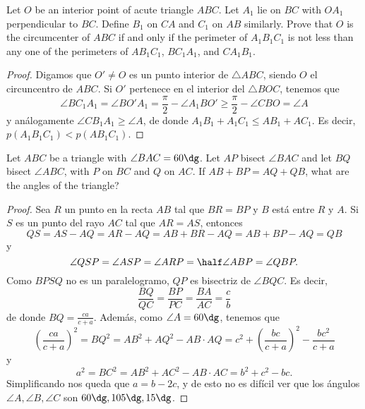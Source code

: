 \begin{probEG}[ISL 2001/G7]
  Let $O$ be an interior point of acute triangle $ABC$. Let $A_1$ lie on $BC$
  with $OA_1$ perpendicular to $BC$. Define $B_1$ on $CA$ and $C_1$ on $AB$
  similarly. Prove that $O$ is the circumcenter of $ABC$ if and only if the
  perimeter of $A_1B_1C_1$ is not less than any one of the perimeters of
  $AB_1C_1$, $BC_1A_1$, and $CA_1B_1$.
\end{probEG}

\begin{proof}
  Digamos que $O'\ne O$ es un punto interior de $\triangle ABC$, siendo $O$ el
  circuncentro de $ABC$. Si $O'$ pertenece en el interior del $\triangle BOC$,
  tenemos que
  \[
    \angle BC_1A_1
    =\angle BO'A_1
    =\frac{\pi}{2}-\angle A_1BO'
    \ge\frac{\pi}{2}-\angle CBO
    =\angle A
  \]
  y análogamente $\angle CB_1A_1\ge\angle A$, de donde
  $A_1B_1+A_1C_1\le AB_1+AC_1$. Es decir, $p(A_1B_1C_1)<p(AB_1C_1)$.
\end{proof}

\begin{probEG}[ISL 2001/G8]
  Let $ABC$ be a triangle with $\angle BAC=60\dg$. Let $AP$ bisect $\angle BAC$
  and let $BQ$ bisect $\angle ABC$, with $P$ on $BC$ and $Q$ on $AC$. If
  $AB+BP=AQ+QB$, what are the angles of the triangle?
\end{probEG}

\begin{proof}
  Sea $R$ un punto en la recta $AB$ tal que $BR=BP$ y $B$ está entre $R$ y $A$.
  Si $S$ es un punto del rayo $AC$ tal que $AR=AS$, entonces
  \[QS=AS-AQ=AR-AQ=AB+BR-AQ=AB+BP-AQ=QB\]
  y
  \[\angle QSP=\angle ASP=\angle ARP=\half\angle ABP=\angle QBP.\]
  Como $BPSQ$ no es un paralelogramo, $QP$ es bisectriz de $\angle BQC$. Es
  decir,
  \[\frac{BQ}{QC}=\frac{BP}{PC}=\frac{BA}{AC}=\frac{c}{b}\]
  de donde $BQ=\frac{ca}{c+a}$. Además, como $\angle A=60\dg$, tenemos que
  \[
    \left(\frac{ca}{c+a}\right)^2
    =BQ^2
    =AB^2+AQ^2-AB\cdot AQ
    =c^2+\left(\frac{bc}{c+a}\right)^2-\frac{bc^2}{c+a}
  \]
  y
  \[a^2=BC^2=AB^2+AC^2-AB\cdot AC=b^2+c^2-bc.\]
  Simplificando nos queda que $a=b-2c$, y de esto no es difícil ver que los
  ángulos $\angle A,\angle B,\angle C$ son $60\dg,105\dg,15\dg$.
\end{proof}



